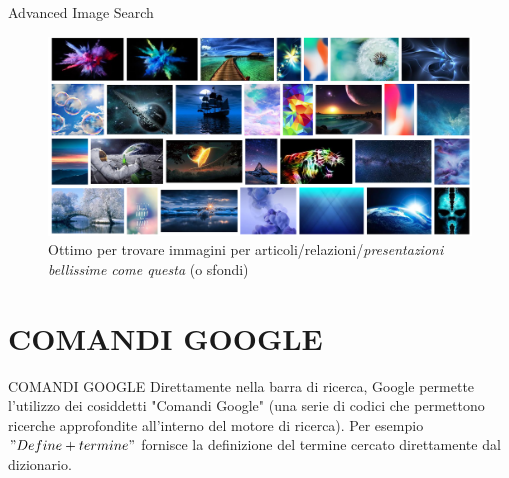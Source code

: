 \documentclass{beamer}
\begin{document}
\begin{frame}{Advanced Image Search}
\begin{figure}[h!]
\includegraphics[width = \linewidth]{immagini/sfondi.png}
\caption {Ottimo per trovare immagini per articoli/relazioni/\textit{presentazioni bellissime come questa} (o sfondi)}
\end{figure}
\end{frame}

\section{COMANDI GOOGLE}
\begin{frame}{COMANDI GOOGLE}
Direttamente nella barra di ricerca, Google permette l'utilizzo dei cosiddetti "Comandi Google" (una serie di codici che permettono ricerche approfondite all'interno del motore di ricerca).
\newline\newline
Per esempio $"Define + termine"$ fornisce la definizione del termine cercato direttamente dal dizionario.
\end{frame}
\end{document}
